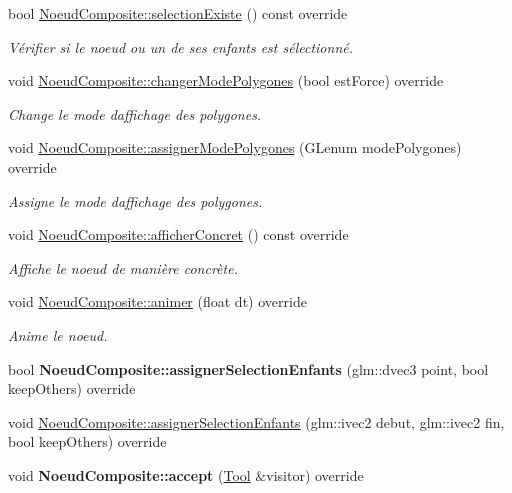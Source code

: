 \begin{DoxyCompactItemize}
bool \hyperlink{group__inf2990_ga3f0b30a39e8e6384e6e3227582c678e0}{Noeud\+Composite\+::selection\+Existe} () const  override
\begin{DoxyCompactList}\small\item\em Vérifier si le noeud ou un de ses enfants est sélectionné. \end{DoxyCompactList}\item 
void \hyperlink{group__inf2990_ga90bb01067866438b80d081967c133b81}{Noeud\+Composite\+::changer\+Mode\+Polygones} (bool est\+Force) override
\begin{DoxyCompactList}\small\item\em Change le mode d\textquotesingle{}affichage des polygones. \end{DoxyCompactList}\item 
void \hyperlink{group__inf2990_ga5caf8a3f9e06915463abdff7a473d95f}{Noeud\+Composite\+::assigner\+Mode\+Polygones} (G\+Lenum mode\+Polygones) override
\begin{DoxyCompactList}\small\item\em Assigne le mode d\textquotesingle{}affichage des polygones. \end{DoxyCompactList}\item 
void \hyperlink{group__inf2990_gaed396ee8ea0396e4a9cf56b69151204b}{Noeud\+Composite\+::afficher\+Concret} () const  override
\begin{DoxyCompactList}\small\item\em Affiche le noeud de manière concrète. \end{DoxyCompactList}\item 
void \hyperlink{group__inf2990_gac641c70147959a57b698854e016ff929}{Noeud\+Composite\+::animer} (float dt) override
\begin{DoxyCompactList}\small\item\em Anime le noeud. \end{DoxyCompactList}\item 
\hypertarget{group__inf2990_ga60b49df4f31e029056837529970ef67f}{}bool {\bfseries Noeud\+Composite\+::assigner\+Selection\+Enfants} (glm\+::dvec3 point, bool keep\+Others) override\label{group__inf2990_ga60b49df4f31e029056837529970ef67f}

\item 
void \hyperlink{group__inf2990_ga98e4e00d1d92ebe6774f72dc712ee6ca}{Noeud\+Composite\+::assigner\+Selection\+Enfants} (glm\+::ivec2 debut, glm\+::ivec2 fin, bool keep\+Others) override
\item 
\hypertarget{group__inf2990_ga0b60c180726f3a0501f42bc70bc0c52e}{}void {\bfseries Noeud\+Composite\+::accept} (\hyperlink{class_tool}{Tool} \&visitor) override\label{group__inf2990_ga0b60c180726f3a0501f42bc70bc0c52e}


\end{DoxyCompactItemize}
